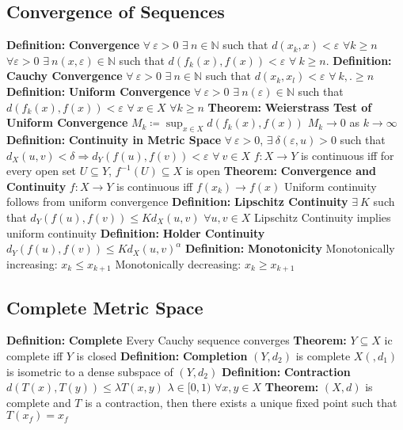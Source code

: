 \documentclass[14pt]{extarticle}
\def\Definition{{\color{blue} \textbf{Definition:} }}
\def\Theorem{{\color{red} \textbf{Theorem:} }}
\begin{document}
\begin{outline}
	\subsection*{Convergence of Sequences}
		\1	\Definition \textbf{Convergence}
			\2	$\forall~\varepsilon > 0$ $\exists~n \in \mathbb{N}$ such that
					$d(x_k,x) < \varepsilon$ $\forall k \ge n$
			\2	$\forall \varepsilon > 0$ $\exists~n(x,\varepsilon) \in \mathbb{N}$
					such that $d(f_k(x),f(x)) < \varepsilon$ $\forall~k \ge n$.
		\1	\Definition \textbf{Cauchy Convergence}
			\2	$\forall~\varepsilon > 0$ $\exists~n \in \mathbb{N}$ such that
					$d(x_k,x_l) < \varepsilon$ $\forall~k,. \ge n$
		\1	\Definition \textbf{Uniform Convergence}
			\2	$\forall~\varepsilon > 0$ $\exists~n(\varepsilon) \in \mathbb{N}$
					such that $d(f_k(x),f(x)) < \varepsilon$ $\forall~x \in X$ $\forall k \ge n$
		\1	\Theorem \textbf{Weierstrass Test of Uniform Convergence}
			\2	$M_k \coloneqq \sup_{x \in X} d(f_k(x),f(x))$
			\2	$M_k \rightarrow 0$ as $k \rightarrow \infty$
		\1	\Definition \textbf{Continuity in Metric Space}
			\2	$\forall~\varepsilon > 0$, $\exists~\delta(\varepsilon,u) > 0$ such that
					$d_X(u,v) < \delta \Rightarrow d_Y(f(u),f(v)) < \varepsilon$ $\forall~v \in X$
			\2	$f : X \rightarrow Y$ is continuous iff for every open set $U \subseteq Y$,
					$f^{-1}(U) \subseteq X$ is open 
		\1	\Theorem \textbf{Convergence and Continuity}
			\2	$f : X \rightarrow Y$ is continuous iff $f(x_k) \rightarrow f(x)$
			\2	Uniform continuity follows from uniform convergence
		\1	\Definition \textbf{Lipschitz Continuity}
			\2	$\exists~K$ such that $d_Y(f(u),f(v)) \le K d_X(u,v)$ $\forall u,v \in X$
			\2	Lipschitz Continuity implies uniform continuity
		\1	\Definition \textbf{Holder Continuity}
			\2	$d_Y(f(u),f(v)) \le K d_X(u,v)^{\alpha}$
		\1	\Definition \textbf{Monotonicity}
			\2	Monotonically increasing: $x_k \le x_{k+1}$
			\2	Monotonically decreasing: $x_k \ge x_{k+1}$
		\subsection*{Complete Metric Space}
			\1	\Definition \textbf{Complete}
				\2	Every Cauchy sequence converges
			\1	\Theorem $Y \subseteq X$ ic complete iff $Y$ is closed
			\1	\Definition \textbf{Completion}
				\2	$(Y,d_2)$ is complete
				\2	$X(,d_1)$ is isometric to a dense subspace of $(Y,d_2)$
			\1	\Definition \textbf{Contraction}
				\2	$d(T(x),T(y)) \le \lambda T(x,y)$ 
				\2	$\lambda \in [0,1)$ $\forall x,y \in X$
			\1	\Theorem $(X,d)$ is complete and $T$ is a contraction, then there
					exists a unique fixed point such that $T(x_f) = x_f$

\end{outline}
\end{document}
